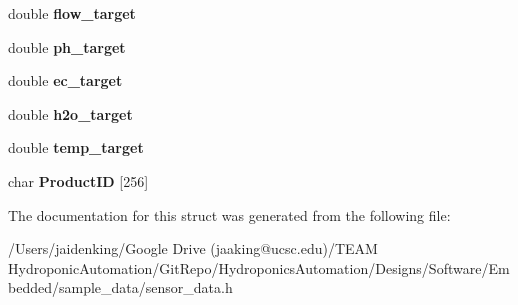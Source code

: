 \begin{DoxyCompactItemize}
double {\bfseries flow\+\_\+target}
\item 
\mbox{\label{struct_sensor_data_a545043ec0cf2aa6af2a6271f03ee2e47}} 
double {\bfseries ph\+\_\+target}
\item 
\mbox{\label{struct_sensor_data_a6e03a33423964cfb40e2f83341b81564}} 
double {\bfseries ec\+\_\+target}
\item 
\mbox{\label{struct_sensor_data_a97c4db92bfb18fa175666fe3a69dcbcb}} 
double {\bfseries h2o\+\_\+target}
\item 
\mbox{\label{struct_sensor_data_accfdb8565180d901fefbecef973f6aa0}} 
double {\bfseries temp\+\_\+target}
\item 
\mbox{\label{struct_sensor_data_a383e7cf3c4615778cd297291cee14aaa}} 
char {\bfseries Product\+ID} \mbox{[}256\mbox{]}
\end{DoxyCompactItemize}


The documentation for this struct was generated from the following file\+:\begin{DoxyCompactItemize}
\item 
/\+Users/jaidenking/\+Google Drive (jaaking@ucsc.\+edu)/\+T\+E\+A\+M Hydroponic\+Automation/\+Git\+Repo/\+Hydroponics\+Automation/\+Designs/\+Software/\+Embedded/sample\+\_\+data/sensor\+\_\+data.\+h\end{DoxyCompactItemize}
